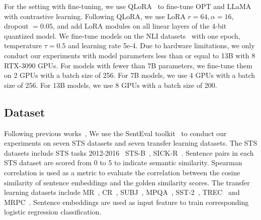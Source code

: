 \documentclass{article}
\begin{document}
For the setting with fine-tuning,
we use QLoRA~\cite{dettmers2023qlora} to fine-tune OPT and LLaMA with contrastive learning.
Following QLoRA, we use LoRA $r=64, \alpha=16$, dropout $=0.05$, and add LoRA modules on all linear layers of the 4-bit quantized model.
We fine-tune models on the NLI datasets~\cite{gao2021simcse} with one epoch, temperature \(\tau = 0.5\) and learning rate 5e-4.
Due to hardware limitations, we only conduct our experiments with model parameters less than or equal to 13B with 8 RTX-3090 GPUs.
For models with fewer than 7B parameters, we fine-tune them on 2 GPUs with a batch size of 256. For 7B models, we use 4 GPUs with a batch size of 256. For 13B models, we use 8 GPUs with a batch size of 200.

\subsection{Dataset}
Following previous works~\cite{gao2021simcse,  jiang2022promptbert},
We use the SentEval toolkit~\cite{conneau2018senteval} to conduct our experiments on seven STS datasets and seven transfer learning datasets.
The STS datasets include STS tasks 2012-2016~\cite{agirre2012semeval, agirre2013sem, agirre2014semeval, agirre2015semeval, agirre2016semeval} STS-B~\cite{cer2017semeval}, SICK-R~\cite{marelli2014sick}. Sentence pairs in each STS dataset are scored from 0 to 5 to indicate semantic similarity.
Spearman correlation is used as a metric to evaluate the correlation between the cosine similarity of sentence embeddings  and the golden similarity scores.
The transfer learning datasets include MR~\cite{pang2005seeing_mr}, CR~\cite{hu2004mining_cr}, SUBJ~\cite{pang2004sentimental_subj}, MPQA~\cite{wiebe2005annotating_mpqa}, SST-2~\cite{socher2013recursive_sst-2}, TREC~\cite{voorhees2000building_trec} and MRPC~\cite{mrpc2005}.
Sentence embeddings are used as input feature to train corresponding logistic regression classification.
\end{document}
